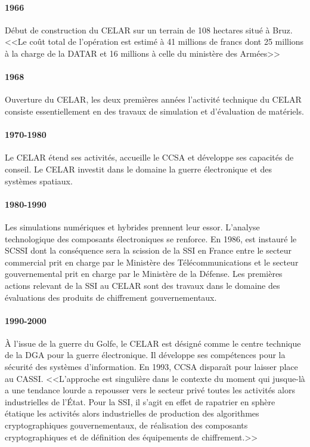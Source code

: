 \documentclass[11pt, book, english, french, standardlists]{upmethodology-document}
\begin{document}
				\paragraph*{1966}
					Début de construction du \gls{CELAR} sur un terrain de 108 hectares situé à Bruz. <<Le coût total de l'opération est estimé à 41 millions de francs dont 25 millions à la charge de la \gls{DATAR} et 16 millions à celle du ministère des Armées>>\cite{CELAR40ansAvenir}
				\paragraph*{1968}
					Ouverture du \gls{CELAR}, les deux premières années l'activité technique du \gls{CELAR} consiste essentiellement en des travaux de simulation et d'évaluation de matériels.
				\paragraph*{1970-1980}
					Le \gls{CELAR} étend ses activités, accueille le \gls{CCSA} et développe ses capacités de conseil. Le \gls{CELAR} investit dans le domaine la guerre électronique et des systèmes spatiaux.
				\paragraph*{1980-1990}
					Les simulations numériques et hybrides prennent leur essor. L'analyse technologique des composants électroniques se renforce. En 1986, est instauré le \gls{SCSSI}\cite{DecretCreationSCSSI} dont la conséquence sera la scission de la \gls{SSI} en France entre le secteur commercial prit en charge par le Ministère des Télécommunications et le secteur gouvernemental prit en charge par le Ministère de la Défense. Les premières actions relevant de la \gls{SSI} au \gls{CELAR} sont des travaux dans le domaine des évaluations des produits de chiffrement gouvernementaux.
				\paragraph*{1990-2000}
					À l'issue de la guerre du Golfe, le \gls{CELAR} est désigné comme le centre technique de la \gls{DGA} pour la guerre électronique. Il développe ses compétences pour la sécurité des systèmes d'information. En 1993, \gls{CCSA} disparaît pour laisser place au \gls{CASSI}. <<L'approche est singulière dans le contexte du moment qui jusque-là a une tendance lourde a repousser vers le secteur privé toutes les activités alors industrielles de l’État. Pour la \gls{SSI}, il s'agit en effet de rapatrier en sphère étatique les activités alors industrielles de production des algorithmes cryptographiques gouvernementaux, de réalisation des composants cryptographiques et de définition des équipements de chiffrement.>>\cite{CELAR40ansAvenir} %
\end{document}
